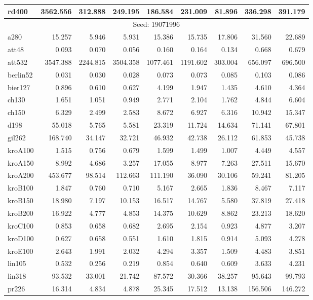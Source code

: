 \begin{center}
\begin{longtable}{lrrrrrrrr}
rd400  & 3562.556 & 312.888 & 249.195 & 186.584 & 231.009 & 81.896 & 336.298 & 391.179\\
\hline \multicolumn{9}{c}{{Seed: 19071996}} \\ \hline
a280   & 15.257 & 5.946 & 5.931 & 15.386 & 15.735 & 17.806 & 31.560 & 22.689\\
att48   & 0.093 & 0.070 & 0.056 & 0.160 & 0.164 & 0.134 & 0.668 & 0.679\\
att532  & 3547.388 & 2244.815 & 3504.358 & 1077.461 & 1191.602 & 303.004 & 656.097 & 696.500\\
berlin52 & 0.031 & 0.030 & 0.028 & 0.073 & 0.073 & 0.085 & 0.103 & 0.086\\
bier127  & 0.896 & 0.610 & 0.627 & 4.199 & 1.947 & 1.435 & 4.610 & 4.364\\
ch130  & 1.651 & 1.051 & 0.949 & 2.771 & 2.104 & 1.762 & 4.844 & 6.604\\
ch150   & 6.329 & 2.499 & 2.583 & 8.672 & 6.927 & 6.316 & 10.942 & 15.347\\
d198   & 55.018 & 5.765 & 5.581 & 23.319 & 11.724 & 14.634 & 71.141 & 67.801\\
gil262   & 168.740 & 34.147 & 32.721 & 46.932 & 42.738 & 26.112 & 61.853 & 45.738\\
kroA100   & 1.515 & 0.756 & 0.679 & 1.599 & 1.499 & 1.007 & 4.449 & 4.557\\
kroA150   & 8.992 & 4.686 & 3.257 & 17.055 & 8.977 & 7.263 & 27.511 & 15.670\\
kroA200   & 453.677 & 98.514 & 112.663 & 111.190 & 36.090 & 30.106 & 59.241 & 81.205\\
kroB100   & 1.847 & 0.760 & 0.710 & 5.167 & 2.665 & 1.836 & 8.467 & 7.117\\
kroB150  & 18.980 & 7.197 & 10.153 & 16.517 & 14.767 & 5.580 & 37.819 & 27.418\\
kroB200   & 16.922 & 4.777 & 4.853 & 14.375 & 10.629 & 8.862 & 23.213 & 18.620\\
kroC100   & 0.853 & 0.658 & 0.682 & 2.695 & 2.154 & 0.923 & 4.877 & 3.207\\
kroD100   & 0.627 & 0.658 & 0.551 & 1.610 & 1.815 & 0.914 & 5.093 & 4.278\\
kroE100   & 2.643 & 1.991 & 2.032 & 4.294 & 3.357 & 1.509 & 4.483 & 3.851\\
lin105   & 0.532 & 0.256 & 0.219 & 0.854 & 0.640 & 0.609 & 3.633 & 4.231\\
lin318  & 93.532 & 33.001 & 21.742 & 87.572 & 30.366 & 38.257 & 95.643 & 99.793\\
pr226  & 16.314 & 4.834 & 4.878 & 25.345 & 17.512 & 13.138 & 156.506 & 146.272\\

\end{longtable}
\end{center}
